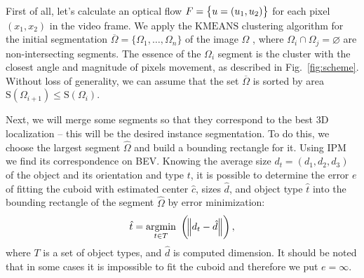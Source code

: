 \documentclass[graybox]{svmult}
\begin{document}
First of all, let's calculate an optical flow $F = \set{u = (u_1, u_2)}$ for each pixel $(x_1, x_2)$ in the video frame. We apply the $\mathrm{KMEANS}$ clustering algorithm  for the initial segmentation $\overline{\Omega} = \{ \Omega_1, \dots, \Omega_n \} $ of the image $\Omega$ , where $\Omega_i \cap \Omega_j = \varnothing $ are non-intersecting segments.
The essence of the $\Omega_i$ segment is the cluster with the closest angle and magnitude of pixels movement, as described in Fig.~\ref{fig:scheme}. Without loss of generality, we can assume that the set $\overline{\Omega}$ is sorted by area $\mathrm{S}(\Omega_{i+1}) \leq \mathrm{S}(\Omega_i)$.

Next, we will merge some segments so that they correspond to the best 3D localization -- this will be the desired instance segmentation. To do this, we choose the largest segment $\hat{\Omega}$ and build a bounding rectangle for it. Using $\mathrm{IPM}$ we find its correspondence on BEV.
Knowing the average size $d_t = (d_1, d_2, d_3)$  of the object and its orientation and type $t$, it is possible to determine the error $e$ of fitting the cuboid  with estimated center $\hat{c}$, sizes $\hat{d}$, and object type $\hat{t}$ into the bounding rectangle of the segment $\hat{\Omega}$ by error minimization:
$$ \hat{t} = \underset{t \in T}{\mathrm{argmin}} ~  \left ( \norm{d_{t} - \hat{d}} \right ), $$
where $T$ is a set of object types, and $\hat{d}$ is computed dimension.
It should be noted that in some cases it is impossible to fit the cuboid and therefore we put $e  = \infty$.\\
\end{document}
